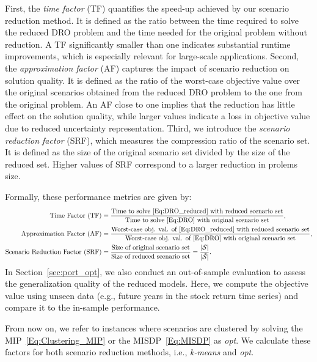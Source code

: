 \documentclass{article}
\newcommand{\mS}{\mathcal{S}}
\newcommand{\tS}{\tilde{\mS}}
\begin{document}
First, the \emph{time factor} (TF) quantifies the speed-up achieved by our scenario reduction method.
It is defined as the ratio between the time required to solve the reduced DRO problem and the time needed for the original problem without reduction.
A TF significantly smaller than one indicates substantial runtime improvements, which is especially relevant for large-scale applications.
Second, the \emph{approximation factor} (AF) captures the impact of scenario reduction on solution quality.
It is defined as the ratio of the worst-case objective value over the original scenarios obtained from the reduced DRO problem to the one from the original problem.
An AF close to one implies that the reduction has little effect on the solution quality, while larger values indicate a loss in objective value due to reduced uncertainty representation.
Third, we introduce the \emph{scenario reduction factor} (SRF), which measures the compression ratio of the scenario set.
It is defined as the size of the original scenario set divided by the size of the reduced set.
Higher values of SRF correspond to a larger reduction in prolems size.

Formally, these performance metrics are given by:
\begin{align}
	\text{Time Factor (TF)} &= \frac{\text{Time to solve \eqref{Eq:DRO_reduced} with reduced scenario set}}{\text{Time to solve \eqref{Eq:DRO} with original scenario set}},\label{Eq:TF}\\
	\text{Approximation Factor (AF)} &= \frac{\text{Worst-case obj. val. of \eqref{Eq:DRO_reduced} with reduced scenario set}}{\text{Worst-case obj. val. of~\eqref{Eq:DRO} with original scenario set}},\label{Eq:AF}\\
	\text{Scenario Reduction Factor (SRF)} &= \frac{\text{Size of original scenario set}}{\text{Size of reduced scenario set}} = \frac{|\mS|}{|\tS|}.\label{Eq:SRF}
\end{align}
In Section~\ref{sec:port_opt}, we also conduct an out-of-sample evaluation to assess the generalization quality of the reduced models.
Here, we compute the objective value using unseen data (e.g., future years in the stock return time series) and compare it to the in-sample performance.



From now on, we refer to instances where scenarios are clustered by solving the MIP~\eqref{Eq:Clustering_MIP} or the MISDP~\eqref{Eq:MISDP} as \emph{opt}.
We calculate these factors for both scenario reduction methods, i.e., \emph{k-means} and \emph{opt}.
\end{document}
